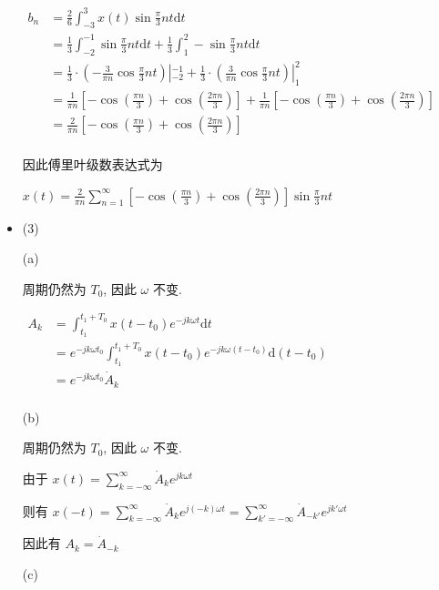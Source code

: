 \documentclass[a4paper,UTF8]{article}
\numberwithin{equation}{section}
\begin{document}
\begin{framed}
\begin{spacing}{1.5}
\begin{itemize}
      $
      \begin{aligned}
      b_n & = \frac{2}{6}\int_{-3}^{3}x(t)\sin \frac{\pi}{3}nt \mathrm{d}t  \\
      & = \frac{1}{3}\int_{-2}^{-1}\sin \frac{\pi}{3}nt \mathrm{d}t + \frac{1}{3}\int_{1}^{2}-\sin \frac{\pi}{3}nt \mathrm{d}t  \\
      & = \frac{1}{3}\cdot (-\frac{3}{\pi n}\cos \frac{\pi}{3}nt)|_{-2}^{-1} + \frac{1}{3}\cdot (\frac{3}{\pi n}\cos \frac{\pi}{3}nt)|_{1}^{2}  \\
      & = \frac{1}{\pi n}[- \cos{(\frac{\pi n}{3})} + \cos{(\frac{2 \pi n}{3})}] + \frac{1}{\pi n}[- \cos{(\frac{\pi n}{3})} + \cos{(\frac{2 \pi n}{3})}]  \\
      & = \frac{2}{\pi n}[- \cos{(\frac{\pi n}{3})} + \cos{(\frac{2 \pi n}{3})}]  \\
      \end{aligned}
      $
      
      因此傅里叶级数表达式为
      
      $\displaystyle x(t) = \frac{2}{\pi n}\sum_{n=1}^{\infty}[- \cos{(\frac{\pi n}{3})} + \cos{(\frac{2 \pi n}{3})}]\sin \frac{\pi}{3}n t$
      
      \item (3)
      
      (a)
      
      周期仍然为 $T_0$, 因此 $\omega$ 不变.
      
      $
      \begin{aligned}
      A_k & = \int_{t_1}^{t_1+T_0}x(t-t_0)e^{-jk\omega t}\mathrm{d}t  \\
      & = e^{-jk\omega t_0}\int_{t_1}^{t_1+T_0}x(t-t_0)e^{-jk\omega (t - t_0)}\mathrm{d}(t-t_0)  \\
      & = e^{-jk\omega t_0}\dot{A}_k  \\
      \end{aligned}
      $
      
      (b)
      
      周期仍然为 $T_0$, 因此 $\omega$ 不变.
      
      由于 $\displaystyle x(t) = \sum_{k=-\infty}^{\infty}\dot{A}_k e^{jk\omega t}$
      
      则有 $\displaystyle x(-t) = \sum_{k=-\infty}^{\infty}\dot{A}_k e^{j(-k)\omega t} = \sum_{k'=-\infty}^{\infty}\dot{A}_{-k'} e^{jk'\omega t}$
      
      因此有 $A_k = \dot{A}_{-k}$
      
      (c)
      

\end{itemize}
\end{spacing}
\end{framed}
\end{document}
